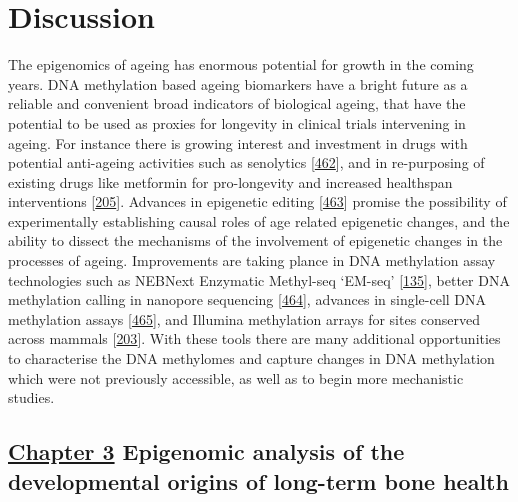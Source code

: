\documentclass[
]{book}
\begin{document}
\hypertarget{discussion}{%
\chapter{Discussion}\label{discussion}}

The epigenomics of ageing has enormous potential for growth in the coming years.
DNA methylation based ageing biomarkers have a bright future as a reliable and convenient broad indicators of biological ageing, that have the potential to be used as proxies for longevity in clinical trials intervening in ageing.
For instance there is growing interest and investment in drugs with potential anti-ageing activities such as senolytics {[}\protect\hyperlink{ref-VanDeursen2019}{462}{]}, and in re-purposing of existing drugs like metformin for pro-longevity and increased healthspan interventions {[}\protect\hyperlink{ref-TAME2020}{205}{]}.
Advances in epigenetic editing {[}\protect\hyperlink{ref-Gjaltema2020}{463}{]} promise the possibility of experimentally establishing causal roles of age related epigenetic changes, and the ability to dissect the mechanisms of the involvement of epigenetic changes in the processes of ageing.
Improvements are taking plance in DNA methylation assay technologies such as NEBNext Enzymatic Methyl-seq `EM-seq' {[}\protect\hyperlink{ref-Williams2019}{135}{]}, better DNA methylation calling in nanopore sequencing {[}\protect\hyperlink{ref-Ni2019}{464}{]}, advances in single-cell DNA methylation assays {[}\protect\hyperlink{ref-Zhu2018a}{465}{]}, and Illumina methylation arrays for sites conserved across mammals {[}\protect\hyperlink{ref-Horvath2020}{203}{]}. With these tools there are many additional opportunities to characterise the DNA methylomes and capture changes in DNA methylation which were not previously accessible, as well as to begin more mechanistic studies.

\hypertarget{chapter-3-epigenomic-analysis-of-the-developmental-origins-of-long-term-bone-health}{%
\section{\texorpdfstring{\protect\hyperlink{arrays}{Chapter 3} Epigenomic analysis of the developmental origins of long-term bone health}{Chapter 3 Epigenomic analysis of the developmental origins of long-term bone health}}\label{chapter-3-epigenomic-analysis-of-the-developmental-origins-of-long-term-bone-health}}
\end{document}
